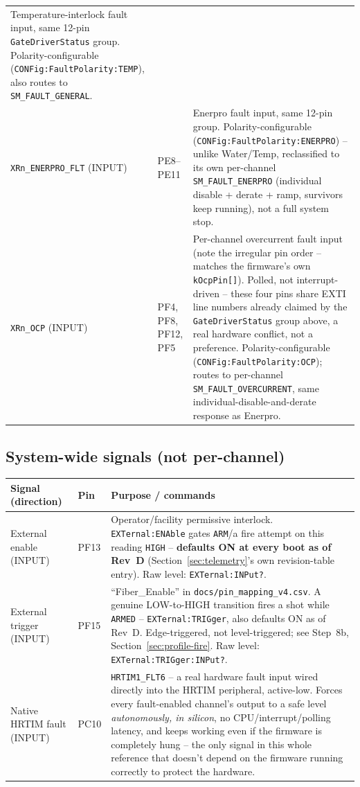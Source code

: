 \documentclass[11pt]{article}
\newcommand{\code}[1]{\texttt{#1}}
\begin{document}
\begin{longtable}{p{1.5in} p{0.95in} p{2.15in}}
    Temperature-interlock fault input, same 12-pin
    \code{GateDriverStatus} group. Polarity-configurable
    (\code{CONFig:FaultPolarity:TEMP}), also routes to
    \code{SM\_FAULT\_GENERAL}. \\
  \code{XRn\_ENERPRO\_FLT} (INPUT) & PE8--PE11 &
    Enerpro fault input, same 12-pin group. Polarity-configurable
    (\code{CONFig:FaultPolarity:ENERPRO}) -- unlike Water/Temp,
    reclassified to its own per-channel \code{SM\_FAULT\_ENERPRO}
    (individual disable + derate + ramp, survivors keep running), not
    a full system stop. \\
  \code{XRn\_OCP} (INPUT) & PF4, PF8, PF12, PF5 &
    Per-channel overcurrent fault input (note the irregular pin order
    -- matches the firmware's own \code{kOcpPin[]}). Polled, not
    interrupt-driven -- these four pins share EXTI line numbers
    already claimed by the \code{GateDriverStatus} group above, a real
    hardware conflict, not a preference. Polarity-configurable
    (\code{CONFig:FaultPolarity:OCP}); routes to per-channel
    \code{SM\_FAULT\_OVERCURRENT}, same individual-disable-and-derate
    response as Enerpro. \\
  \hline
\end{longtable}

\subsection{System-wide signals (not per-channel)}

\begin{longtable}{p{1.3in} p{0.45in} p{2.85in}}
  \hline
  \textbf{Signal (direction)} & \textbf{Pin} & \textbf{Purpose / commands} \\
  \hline
  \endhead
  External enable (INPUT) & PF13 & Operator/facility permissive
    interlock. \code{EXTernal:ENAble} gates \code{ARM}/a fire attempt
    on this reading \code{HIGH} -- \textbf{defaults ON at every boot as
    of Rev~D} (Section~\ref{sec:telemetry}'s own revision-table
    entry). Raw level: \code{EXTernal:INPut?}. \\
  External trigger (INPUT) & PF15 & ``Fiber\_Enable'' in
    \code{docs/pin\_mapping\_v4.csv}. A genuine LOW-to-HIGH transition
    fires a shot while \code{ARMED} -- \code{EXTernal:TRIGger}, also
    defaults ON as of Rev~D. Edge-triggered, not level-triggered; see
    Step~8b, Section~\ref{sec:profile-fire}. Raw level:
    \code{EXTernal:TRIGger:INPut?}. \\
  Native HRTIM fault (INPUT) & PC10 & \code{HRTIM1\_FLT6} -- a real
    hardware fault input wired directly into the HRTIM peripheral,
    active-low. Forces every fault-enabled channel's output to a safe
    level \emph{autonomously, in silicon}, no CPU/interrupt/polling
    latency, and keeps working even if the firmware is completely
    hung -- the only signal in this whole reference that doesn't
    depend on the firmware running correctly to protect the hardware. \\
  \hline
\end{longtable}
\end{document}
